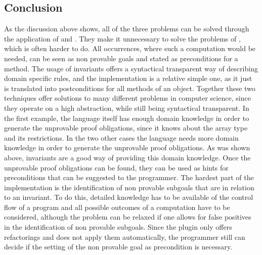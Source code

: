 \subsection{Conclusion}
As the discussion above shows, all of the three problems can be solved through the application of  and . They make it unnecessary to solve the problems of , which is often harder to do. All occurrences, where such a computation would be needed, can be seen as non provable goals and stated as preconditions for a method. The usage of invariants offers a syntactical transparent way of describing domain specific rules, and the implementation is a relative simple one, as it just is translated into postconditions for all methods of an object. Together these two techniques offer solutions to many different problems in computer science, since they operate on a high abstraction, while still being syntactical transparent.\newline 
In the first example, the language itself has enough domain knowledge in order to generate the unprovable proof obligations, since it knows about the array type and its restrictions. In the two other cases the language  needs more domain knowledge in order to generate the unprovable proof obligations. As was shown above, invariants are a good way of providing this domain knowledge.
Once the unprovable proof obligations can be found, they can be used as hints for preconditions that can be suggested to the programmer.\newline
The hardest part of the implementation is the identification of non provable subgoals that are in relation to an invariant. To do this, detailed knowledge has to be available of the control flow of a program and all possible outcomes of a computation have to be considered, although the problem can be relaxed if one allows for false positives in the identification of non provable subgoals. Since the plugin only offers refactorings and does not apply them automatically, the programmer still can decide if the setting of the non provable goal as precondition is necessary.  
